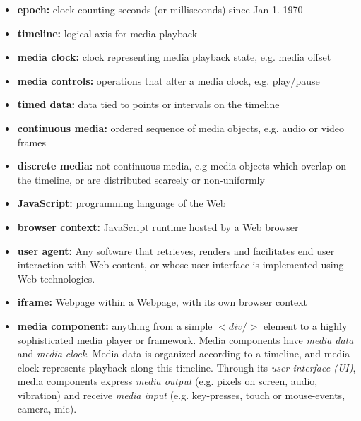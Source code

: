 \begin{itemize}
\item{\textbf{epoch:} clock counting seconds (or milliseconds) since Jan 1. 1970}
\item{\textbf{timeline:} logical axis for media playback}
\item{\textbf{media clock:} clock representing media playback state, e.g. media offset}
\item{\textbf{media controls:} operations that alter a media clock, e.g. play/pause}
\item{\textbf{timed data:} data tied to points or intervals on the timeline}
\item{\textbf{continuous media:} ordered sequence of media objects, e.g. audio or video frames}
\item{\textbf{discrete media:} not continuous media, e.g media objects which overlap on the timeline, or are distributed scarcely or non-uniformly}
\item{\textbf{JavaScript:} programming language of the Web}
\item{\textbf{browser context:} JavaScript runtime hosted by a Web browser}
\item{\textbf{user agent:} Any software that retrieves, renders and facilitates end user interaction with Web content, or whose user interface is implemented using Web technologies.~\cite{useragent}}
\item{\textbf{iframe:} Webpage within a Webpage, with its own browser context}
\item{\textbf{media component:} anything from a simple $<div/>$ element to a highly sophisticated media player or framework. Media components have \emph{media data} and \emph{media clock}. Media data
is organized according to a timeline, and media clock represents playback along
this timeline. Through its \emph{user interface (UI)}, media components
express \emph{media output} (e.g. pixels on screen, audio, vibration) and
receive \emph{media input} (e.g. key-presses, touch or mouse-events, camera, mic).}
\end{itemize}